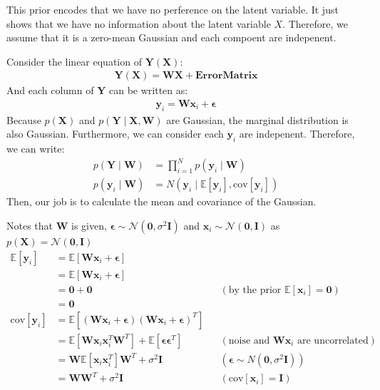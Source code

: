 \documentclass[12pt]{article}
\newenvironment{question}[2][Question]{\begin{trivlist}
\kern10pt
\item[\hskip \labelsep {\bfseries #1}\hskip \labelsep {\bfseries #2.}]}{\end{trivlist}}
\begin{document}
\begin{question}{12}
This prior encodes that we have no perference on the latent variable. It just 
 shows that we have no information about the latent variable $X$. Therefore, 
 we assume that it is a zero-mean Gaussian and each compoent are indepenent.
\end{question}

\begin{question}{13}
Consider the linear equation of $\mathbf{Y}(\mathbf{X})$:
  \begin{align*}
    \mathbf{Y}(\mathbf{X}) = \mathbf{W}\mathbf{X} + \bm{ErrorMatrix}
  \end{align*}
And each column of $\mathbf{Y}$ can be written as:
\begin{align*}
  \mathbf{y}_i = \mathbf{W}\mathbf{x}_i + \bm{\epsilon}
\end{align*}
Because $p(\mathbf{X})$ and $p(\mathbf{Y}\mid\mathbf{X}, \mathbf{W})$ are Gaussian, 
 the marginal distribution is also Gaussian.
 Furthermore, we can consider each $\mathbf{y}_i$ are indepenent. Therefore, 
 we can write:
\begin{align*}
  p(\mathbf{Y}\mid\mathbf{W}) &= \prod_{i=1}^{N} p(\mathbf{y}_i\mid\mathbf{W}) \\
  p(\mathbf{y}_i\mid\mathbf{W}) &= N(\mathbf{y}_i\mid \mathbb{E}[\mathbf{y}_i], \text{cov}[\mathbf{y}_i])
\end{align*}
Then, our job is to calculate the mean and covariance of the Gaussian.

Notes that $\mathbf{W}$ is given, $\bm{\epsilon} \sim \mathcal{N}(\mathbf{0}, \sigma^2\mathbf{I})$
 and $\mathbf{x}_i \sim \mathcal{N}(\mathbf{0}, \mathbf{I})$ as 
 $p(\mathbf{X}) = \mathcal{N}(\mathbf{0}, \mathbf{I})$
\begin{align*}
  \mathbb{E}[\mathbf{y}_i] &= \mathbb{E}[\mathbf{W}\mathbf{x}_i + \bm{\epsilon}] \\ 
  &= \mathbb{E}[\mathbf{W}\mathbf{x}_i + \bm{\epsilon}] \\
  &= \mathbf{0} + \mathbf{0} 
                      && (\text{by the prior }\mathbb{E}[\mathbf{x}_i] = \mathbf{0})\\
  &= \mathbf{0} \\
  \text{cov}[\mathbf{y}_i] 
  &= \mathbb{E}[(\mathbf{W}\mathbf{x}_i + \bm{\epsilon})
                (\mathbf{W}\mathbf{x}_i + \bm{\epsilon})^{T}] \\
  &= \mathbb{E}[\mathbf{W}\mathbf{x}_i\mathbf{x}_i^T\mathbf{W}^T]
     + \mathbb{E}[\bm{\epsilon}\bm{\epsilon}^{T}]
     && (\text{noise and }\mathbf{W}\mathbf{x}_i\text{ are uncorrelated}) \\
  &= \mathbf{W}\mathbb{E}[\mathbf{x}_i\mathbf{x}_i^T]\mathbf{W}^T + \sigma^2 \mathbf{I}
     && (\bm{\epsilon} \sim N(\mathbf{0}, \sigma^2\mathbf{I})) \\
  &= \mathbf{W}\mathbf{W}^T + \sigma^2\mathbf{I}
     && (\text{cov}[\mathbf{x}_i] = \mathbf{I})
\end{align*}


\end{question}
\end{document}
